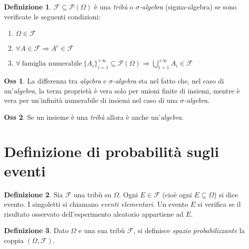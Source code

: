 \documentclass[12pt, a4paper]{report}
\theoremstyle{definition}
\newtheorem{definition}{Definizione}[section]
\newtheorem*{observation}{Oss}
\DeclareRobustCommand{\F}{\mathcal{F}}%
\DeclareRobustCommand{\powerset}{\mathcal{P}(\Omega)}
\DeclareRobustCommand{\tribedef}{\F\subseteq \powerset}
\begin{document}
\begin{definition}
	$\tribedef$ è una \emph{tribù} o \emph{$\sigma$-algebra} (sigma-algebra) se
	sono verificate le seguenti condizioni:
	\begin{enumerate}[label=(\roman*)]
		\item \(\Omega\in\F\)
		\item \(\forall A\in\F \Rightarrow A^c\in\F\)
		\item \(\forall\ \text{famiglia numerabile}\ \{A_i\}_{i=1}^{+\infty}
		\subseteq\powerset \Rightarrow \bigcup_{i=1}^{+\infty}A_i\in\F\)
	\end{enumerate}
\end{definition}
\begin{observation}
	La differenza tra \emph{algebra} e \emph{$\sigma$-algebra} sta nel fatto che,
	nel caso di	un'\emph{algebra}, la terza proprietà è vera solo per unioni
	finite di insiemi, mentre è vera per un'infinità numerabile di insiemi nel
	caso di una \emph{$\sigma$-algebra}.
\end{observation}
\begin{observation}
	Se un insieme è una \emph{tribù} allora è anche un'\emph{algebra}.
\end{observation}

\section{Definizione di probabilità sugli eventi}
\begin{definition}
	Sia $\F$ una tribù su $\Omega$. Ogni \(E\in\F\) (cioè ogni \(E\subseteq\Omega\))
	si dice evento. I singoletti si chiamano \emph{eventi elementari}. Un evento
	$E$ si verifica se il risultato osservato dell'esperimento aleatorio
	appartiene ad $E$.
\end{definition}

\begin{definition}
	Dato $\Omega$ e una sua tribù $\F$, si definisce \emph{spazio probabilizzante}
	la coppia $(\Omega, \F)$.
\end{definition}
\end{document}
